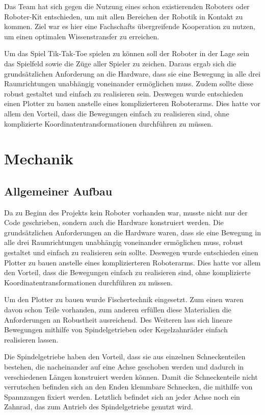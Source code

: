 \documentclass[conference,compsoc,final,a4paper]{IEEEtran}
\begin{document}
Das Team hat sich gegen die Nutzung eines schon existierenden Roboters oder Roboter-Kit
entschieden, um mit allen Bereichen der Robotik in Kontakt zu kommen. Ziel war es hier
eine Fachschafts übergreifende Kooperation zu nutzen, um einen optimalen Wissenstransfer
zu erreichen.

Um das Spiel Tik-Tak-Toe spielen zu können soll der Roboter in der Lage sein das Spielfeld
sowie die Züge aller Spieler zu zeichen. Daraus ergab sich die grundsätzlichen Anforderung
an die Hardware, dass sie eine Bewegung in alle drei Raumrichtungen unabhängig voneinander
ermöglichen muss. Zudem sollte diese robust gestaltet und einfach zu realisieren sein.
Deswegen wurde entschieden einen Plotter zu bauen anstelle eines komplizierteren
Roboterarms. Dies hatte vor allem den Vorteil, dass die Bewegungen einfach zu realisieren
sind, ohne komplizierte Koordinatentransformationen durchführen zu müssen.


\section{Mechanik}

\subsection{Allgemeiner Aufbau}

Da zu Beginn des Projekts kein Roboter vorhanden war, musste nicht nur der Code geschrieben, sondern auch die Hardware
konstruiert werden. Die grundsätzlichen Anforderungen an die Hardware waren, dass sie eine Bewegung in alle drei Raumrichtungen
unabhängig voneinander ermöglichen muss, robust gestaltet und einfach zu realisieren sein sollte. Deswegen wurde entschieden einen
Plotter zu bauen anstelle eines komplizierteren Roboterarms. Dies hatte vor allem den Vorteil, dass die Bewegungen einfach zu
realisieren sind, ohne komplizierte Koordinatentransformationen durchführen zu müssen.

Um den Plotter zu bauen wurde Fischertechnik eingesetzt. Zum einen waren davon schon Teile vorhanden, zum anderen erfüllen diese
Materialien die Anforderungen an Robustheit ausreichend. Des Weiteren lass sich lineare Bewegungen mithilfe von Spindelgetrieben
oder Kegelzahnräder einfach realisieren lassen.

Die Spindelgetriebe haben den Vorteil, dass sie aus einzelnen Schneckenteilen bestehen, die nacheinander auf eine Achse geschoben
werden und dadurch in verschiedenen Längen konstruiert werden können. Damit die Schneckenteile nicht verrutschen befinden sich an
den Enden klemmbare Schnecken, die mithilfe von Spannzangen fixiert werden. Letztlich befindet sich an jeder Achse noch ein Zahnrad,
das zum Antrieb des Spindelgetriebe genutzt wird.
\end{document}
